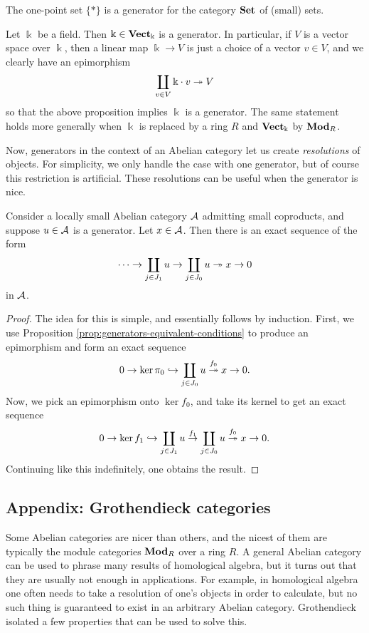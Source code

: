 \begin{example}
	The one-point set \(\{*\}\) is a generator for the category \(\mathbf{Set}\) of (small) sets.
\end{example}
\begin{example}
	Let \(\Bbbk\) be a field. Then \(\Bbbk\in\mathbf{Vect}_\Bbbk\) is a generator. In particular, if \(V\) is a vector space over \(\Bbbk\), then a linear
	map \(\Bbbk\to V\) is just a choice of a vector \(v\in V\), and we clearly have an epimorphism
	\[ \coprod_{v\in V}\Bbbk\cdot v \twoheadrightarrow V \]
	so that the above proposition implies \(\Bbbk\) is a generator. The same statement holds more generally when \(\Bbbk\) is replaced by a ring \(R\)
	and \(\mathbf{Vect}_\Bbbk\) by \(\mathbf{Mod}_R\).
\end{example}

Now, generators in the context of an Abelian category let us create \emph{resolutions} of objects. For simplicity, we only handle the case
with one generator, but of course this restriction is artificial. These resolutions can be useful when the generator is nice.
\begin{proposition}
	Consider a locally small Abelian category \(\mathcal{A}\) admitting small coproducts, and suppose \(u\in\mathcal{A}\) is a generator. Let \(x\in\mathcal{A}\). Then there is an exact sequence
	of the form
	\[ \cdots \to \coprod_{j \in J_1}u \to \coprod_{j\in J_0}u \twoheadrightarrow x \to 0 \]
	in \(\mathcal{A}\).
\end{proposition}
\begin{proof}
The idea for this is simple, and essentially follows by induction. First, we use Proposition \ref{prop:generators-equivalent-conditions} to produce an epimorphism and form an
exact sequence
\[ 0 \to \ker{\pi_0} \hookrightarrow \coprod_{j\in J_0}u \overset{f_0}{\twoheadrightarrow} x \to 0. \]
Now, we pick an epimorphism onto \(\ker{f_0}\), and take its kernel to get an exact sequence
\[ 0 \to \ker{f_1} \hookrightarrow \coprod_{j\in J_1} u \overset{f_1}\to \coprod_{j\in J_0}u \overset{f_0}{\twoheadrightarrow} x \to 0. \]
Continuing like this indefinitely, one obtains the result.
\end{proof}


\subsection{Appendix: Grothendieck categories}
Some Abelian categories are nicer than others, and the nicest of them are typically the module categories \(\mathbf{Mod}_R\) over a ring \(R\). A general Abelian category can be used
to phrase many results of homological algebra, but it turns out that they are usually not enough in applications. For example, in homological algebra one often needs to take a
resolution of one's objects in order to calculate, but no such thing is guaranteed to exist in an arbitrary Abelian category. Grothendieck isolated a few properties
that can be used to solve this.

